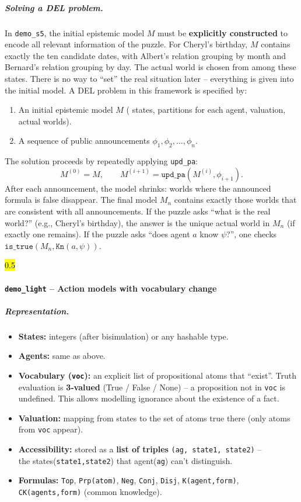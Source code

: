\subparagraph*{{Solving a DEL problem.}}
In \texttt{demo\_s5}, the initial epistemic model 
$M$ must be \textbf{explicitly constructed} to encode 
all relevant information of the puzzle. 
For Cheryl’s birthday, $M$ contains exactly the ten 
candidate dates, with Albert’s relation grouping 
by month and Bernard’s relation grouping by day. 
The actual world is chosen from among these states. 
There is no way to “set” the real situation later – 
everything is given into the initial model.
A DEL problem in this framework is specified by:
\begin{enumerate}
    \item An initial epistemic model $M$ (
        states, partitions for each agent, valuation, actual worlds).
    \item A sequence of public announcements $\phi_1, \phi_2, \dots, \phi_n$.
\end{enumerate}
The solution proceeds by repeatedly applying \texttt{upd\_pa}:
\[
M^{(0)} = M,\qquad M^{(i+1)} = \texttt{upd\_pa}(M^{(i)}, \phi_{i+1}).
\]
After each announcement, the model shrinks: 
worlds where the announced formula is false disappear. 
The final model $M_n$ contains exactly 
those worlds that are consistent with all announcements. 
If the puzzle asks “what is the real world?” (e.g., Cheryl’s birthday), 
the answer is the unique actual world in $M_n$ (if exactly one remains). 
If the puzzle asks “does agent $a$ know $\psi$?”, 
one checks $\texttt{is\_true}(M_n, \texttt{Kn}(a,\psi))$.

\hl{0.5}

\paragraph*{\texttt{demo\_light} – Action models with vocabulary change}

\subparagraph*{Representation.}
\begin{itemize}
    \item \textbf{States:} integers (after bisimulation) or any hashable type.
    \item \textbf{Agents:} same as above.
    \item \textbf{Vocabulary (\texttt{voc}):} an explicit list of propositional 
    atoms that ``exist''. Truth evaluation is \textbf{3‑valued} 
    (True / False / None) – a proposition not in \texttt{voc} is undefined. 
    This allows modelling ignorance about the existence of a fact.
    \item \textbf{Valuation:} mapping from states to the set of 
    atoms true there (only atoms from \texttt{voc} appear).
    \item \textbf{Accessibility:} stored as a \textbf{list of triples} 
    \texttt{(ag, state1, state2)} – \\ the states(\texttt{state1,state2}) 
    that agent(\texttt{ag}) can't 
    distinguish.
    \item \textbf{Formulas:} \texttt{Top}, 
    \texttt{Prp(atom)}, \texttt{Neg}, 
    \texttt{Conj}, \texttt{Disj}, \texttt{K(agent,form)}, 
    \texttt{CK(agents,form)} (common knowledge).
\end{itemize}

